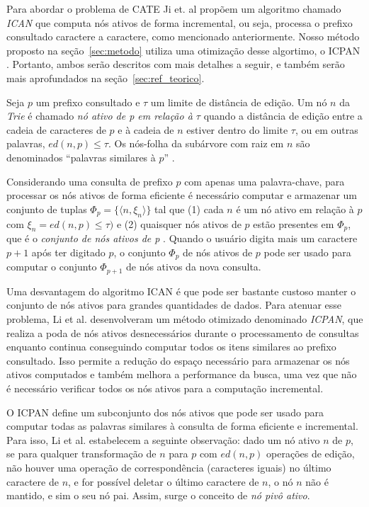 Para abordar o problema de CATE Ji et. al \citep{ji2009efficient} propõem um algoritmo chamado \textit{ICAN} que computa nós ativos de forma incremental, ou seja, processa o prefixo consultado caractere a caractere, como mencionado anteriormente. Nosso método proposto na seção~\ref{sec:metodo} utiliza uma otimização desse algortimo, o ICPAN \citep{li2011efficient}. Portanto, ambos serão descritos com mais detalhes a seguir, e também serão mais aprofundados na seção~\ref{sec:ref_teorico}. 

Seja $p$ um prefixo consultado e $\tau$ um limite de distância de edição. Um nó $n$ da \textit{Trie} é chamado \textit{nó ativo de p em relação à $\tau$} quando a distância de edição entre a cadeia de caracteres de $p$ e à cadeia de $n$ estiver dentro do limite $\tau$, ou em outras palavras, $ed(n, p) \leq \tau$. Os nós-folha da subárvore com raiz em $n$ são denominados ``palavras similares à $p$'' \citep{ji2009efficient}. 

Considerando uma consulta de prefixo $p$ com apenas uma palavra-chave, para processar os nós ativos de forma eficiente é necessário computar e armazenar um conjunto de tuplas $\Phi_{p} = \{ \langle n, \xi_{n} \rangle \}$ tal que (1) cada $n$ é um nó ativo em relação à $p$ com $\xi_{n} = ed(n, p) \leq \tau)$ e (2) quaisquer nós ativos de $p$ estão presentes em $\Phi_{p}$, que é o \textit{conjunto de nós ativos de p} \citep{ji2009efficient}. Quando o usuário digita mais um caractere $p + 1$ após ter digitado $p$, o conjunto $\Phi_{p}$ de nós ativos de $p$ pode ser usado para computar o conjunto $\Phi_{p + 1}$ de nós ativos da nova consulta.

Uma desvantagem do algoritmo ICAN é que pode ser bastante custoso manter o conjunto de nós ativos para grandes quantidades de dados. Para atenuar esse problema, Li et al. \citep{li2011efficient} desenvolveram um método otimizado denominado \textit{ICPAN}, que realiza a poda de nós ativos desnecessários durante o processamento de consultas enquanto continua conseguindo computar todos os itens similares ao prefixo consultado. Isso permite a redução do espaço necessário para armazenar os nós ativos computados e também melhora a performance da busca, uma vez que não é necessário verificar todos os nós ativos para a computação incremental.

O ICPAN define um subconjunto dos nós ativos que pode ser usado para computar todas as palavras similares à consulta de forma eficiente e incremental. Para isso, Li et al. \citep{li2011efficient} estabelecem a seguinte observação: dado um nó ativo $n$ de $p$, se para qualquer transformação de $n$ para $p$ com $ed(n,p)$ operações de edição, não houver uma operação de correspondência (caracteres iguais) no último caractere de $n$, e for possível deletar o último caractere de $n$, o nó $n$ não é mantido, e sim o seu nó pai. Assim, surge o conceito de \textit{nó pivô ativo}.

